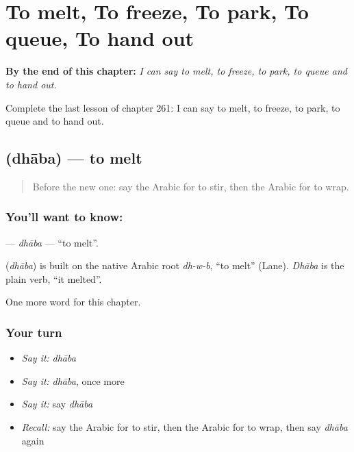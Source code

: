
\chapter{To melt, To freeze, To park, To queue, To hand out}
\label{ch:ar-to-melt-to-freeze-to-park-to-queue-to-hand-out}

\begin{chapteropening}
\textbf{By the end of this chapter:} \emph{I can say to melt, to freeze, to park, to queue and to hand out.}

Complete the last lesson of chapter 261: I can say to melt, to freeze, to park, to queue and to hand out.
\end{chapteropening}

\section[\texorpdfstring{\ar{ذاب} (dhāba)}{ذاب (dhāba)}]{ (dhāba) — to melt}

\label{lesson:AR-C261-dhaba}



\begin{quote}
Before the new one: say the Arabic for to stir, then the Arabic for to wrap.
\end{quote}

\subsection*{You'll want to know: }
\textbf{} — \emph{dhāba} — \textquotedblleft{}to melt\textquotedblright{}.

\begin{cousinweb}
\textbf{} (\emph{dhāba}) is built on the native Arabic root \emph{dh-w-b}, \textquotedblleft{}to melt\textquotedblright{} (Lane). \emph{Dhāba} is the plain verb, \textquotedblleft{}it melted\textquotedblright{}.
\end{cousinweb}

\begin{grammarlens}[title={What you've built}]
One more word for this chapter.
\end{grammarlens}

\subsection*{Your turn}
\begin{itemize}
\raggedright
  \item \emph{Say it:} \emph{dhāba}
  \item \emph{Say it:} \emph{dhāba}, once more
  \item \emph{Say it:} say \emph{dhāba}
  \item \emph{Recall:} say the Arabic for to stir, then the Arabic for to wrap, then say \emph{dhāba} again
\end{itemize}

